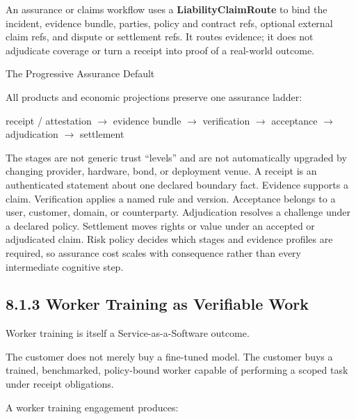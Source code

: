 \documentclass[
  11pt,
]{article}
\begin{document}
An assurance or claims workflow uses a \textbf{LiabilityClaimRoute} to bind
the incident, evidence bundle, parties, policy and contract refs, optional
external claim refs, and dispute or settlement refs. It routes evidence; it
does not adjudicate coverage or turn a receipt into proof of a real-world
outcome.

The Progressive Assurance Default

All products and economic projections preserve one assurance ladder:

\begin{center}
receipt / attestation $\rightarrow$ evidence bundle $\rightarrow$
verification $\rightarrow$ acceptance $\rightarrow$ adjudication
$\rightarrow$ settlement
\end{center}

The stages are not generic trust ``levels'' and are not automatically upgraded
by changing provider, hardware, bond, or deployment venue. A receipt is an
authenticated statement about one declared boundary fact. Evidence supports a
claim. Verification applies a named rule and version. Acceptance belongs to a
user, customer, domain, or counterparty. Adjudication resolves a challenge
under a declared policy. Settlement moves rights or value under an accepted or
adjudicated claim. Risk policy decides which stages and evidence profiles are
required, so assurance cost scales with consequence rather than every
intermediate cognitive step.

\hypertarget{worker-training-as-verifiable-work}{%
\subsection{8.1.3 Worker Training as Verifiable
Work}\label{worker-training-as-verifiable-work}}

Worker training is itself a Service-as-a-Software outcome.

The customer does not merely buy a fine-tuned model. The customer buys a
trained, benchmarked, policy-bound worker capable of performing a scoped
task under receipt obligations.

A worker training engagement produces:
\end{document}
